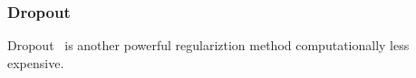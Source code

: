 \subsubsection{Dropout}

Dropout~\cite{JMLR:v15:srivastava14a} is another powerful regulariztion method computationally less expensive. 
